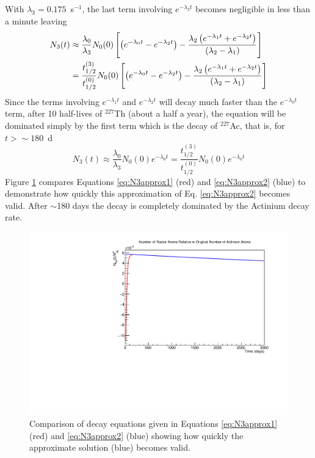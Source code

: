 \documentclass[11pt]{article}
\begin{document}
With $\lambda_3=0.175$~s$^{-1}$, the last term involving $e^{-\lambda_3t}$ becomes negligible in less than a minute leaving
\begin{align}
\label{eq:N3approx1}
N_3(t)&\approx\frac{\lambda_0}{\lambda_3}N_0(0)\left[\left(e^{-\lambda_0t}-e^{-\lambda_2t}\right)-\frac{\lambda_2\left(e^{-\lambda_1t}+e^{-\lambda_2t}\right)}{(\lambda_2-\lambda_1)}\right]\notag\\&=\frac{t^{(3)}_{1/2}}{t^{(0)}_{1/2}}N_0(0)\left[\left(e^{-\lambda_0t}-e^{-\lambda_2t}\right)-\frac{\lambda_2\left(e^{-\lambda_1t}+e^{-\lambda_2t}\right)}{(\lambda_2-\lambda_1)}\right]
\end{align}
Since the terms involving $e^{-\lambda_1t}$ and $e^{-\lambda_2t}$ will decay much faster than the $e^{-\lambda_0t}$ term, after 10 half-lives of $^{227}$Th (about a half a year), the equation will be dominated simply by the first term which is the decay of $^{227}$Ac, that is, for $t>\sim 180$~d
\begin{equation}
\label{eq:N3approx2}
N_3(t)\approx\frac{\lambda_0}{\lambda_3}N_0(0)e^{-\lambda_0t}=\frac{t^{(3)}_{1/2}}{t^{(0)}_{1/2}}N_0(0)e^{-\lambda_0t}
\end{equation}
Figure \ref{fig:approx} compares Equations \ref{eq:N3approx1} (red) and \ref{eq:N3approx2} (blue) to demonstrate how quickly this approximation of Eq. \ref{eq:N3approx2} becomes valid. After $\sim$180 days the decay is completely dominated by the Actinium decay rate.
\begin{figure}[h]
\label{fig:approx}
\centering\includegraphics[width=0.8\linewidth]{NRadonvst}
\caption{Comparison of decay equations given in Equations \ref{eq:N3approx1} (red) and \ref{eq:N3approx2} (blue) showing how quickly the approximate solution (blue) becomes valid.}
\end{figure}
\end{document}
